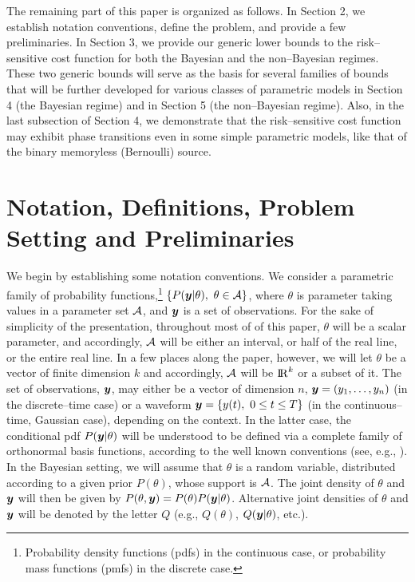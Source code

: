 \documentclass[11pt,epsf]{article}
\newcommand {\reals} {{\rm I\!R}}
\newcommand {\by} {\mbox{\boldmath $y$}}
\newcommand{\calA}{{\cal A}}
\begin{document}
The remaining part of this paper is organized as follows.
In Section 2, we establish notation conventions, define the problem, and
provide a few preliminaries.
In Section 3, we provide our generic lower bounds to the risk--sensitive cost
function for both the Bayesian and the non--Bayesian regimes. These two generic
bounds will serve as the basis for several families of bounds that will be
further developed for various classes of parametric models in Section 4 (the
Bayesian regime) and in Section 5 (the non--Bayesian regime). Also, in the
last subsection of
Section 4, we demonstrate that the 
risk--sensitive cost function may exhibit phase transitions
even in some simple parametric models, like that of the binary memoryless
(Bernoulli) source.

\section{Notation, Definitions, Problem Setting and Preliminaries}

We begin by establishing some notation conventions.
We consider a parametric family of probability functions,\footnote{Probability
density functions (pdfs) in the
continuous case, or probability mass functions (pmfs) in the discrete case.}
$\{P(\by|\theta),~\theta\in\calA\}$, where $\theta$ is parameter taking
values in a parameter set $\calA$, and $\by$ is a set of observations.
For the sake of simplicity of the presentation, throughout most of
of this paper, $\theta$ will be a scalar parameter, and accordingly, 
$\calA$ will be either an interval, or half of the real line, or the entire real line.
In a few places along the paper, however, we will let $\theta$ be a vector of finite dimension
$k$ and accordingly, $\calA$ will be $\reals^k$ or a subset of it. The
set of observations, $\by$, may either be a vector of dimension $n$,
$\by=(y_1,\ldots,y_n)$ (in the discrete--time case) or a waveform 
$\by=\{y(t),~0\le t\le T\}$ (in the continuous--time, Gaussian case), depending
on the context. In the latter case, the conditional pdf $P(\by|\theta)$ will be understood
to be defined via a complete family of orthonormal basis functions, according
to the well known conventions (see, e.g., \cite[Chap.\ 8]{Gallager68}). 
In the Bayesian setting, we will assume that
$\theta$ is a random variable, distributed according to a given prior
$P(\theta)$, whose support is $\calA$. The joint density of $\theta$ and $\by$
will then be given by $P(\theta,\by)=P(\theta)P(\by|\theta)$. Alternative
joint densities of $\theta$ and $\by$ will be denoted by the letter $Q$ (e.g.,
$Q(\theta)$, $Q(\by|\theta)$, etc.). 
\end{document}
